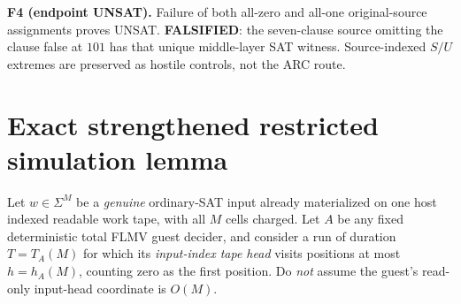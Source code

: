\documentclass[11pt]{article}
\begin{document}
\noindent\textbf{F4 (endpoint UNSAT).} Failure of both all-zero and all-one original-source assignments proves UNSAT. \textbf{FALSIFIED}: the seven-clause source omitting the clause false at $101$ has that unique middle-layer SAT witness. Source-indexed $S/U$ extremes are preserved as hostile controls, not the ARC route.

\section*{Exact strengthened restricted simulation lemma}
Let $w\in\Sigma^M$ be a \emph{genuine} ordinary-SAT input already materialized on one host indexed readable work tape, with all $M$ cells charged. Let $A$ be any fixed deterministic total FLMV guest decider, and consider a run of duration $T=T_A(M)$ for which its \emph{input-index tape head} visits positions at most $h=h_A(M)$, counting zero as the first position. Do \emph{not} assume the guest's read-only input-head coordinate is $O(M)$.
\end{document}
